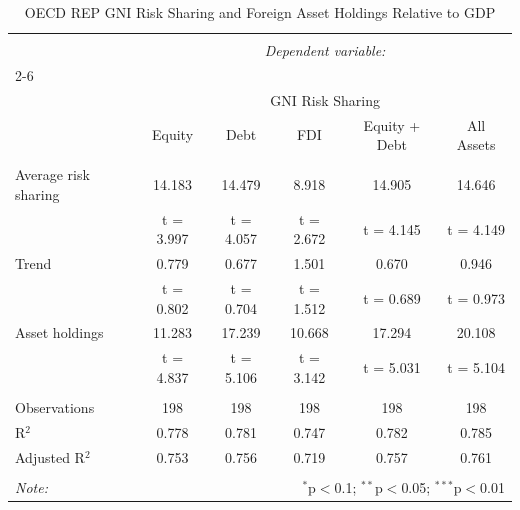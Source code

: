 
\begin{table}[!htbp] \centering 
  \caption{OECD REP GNI Risk Sharing and Foreign Asset Holdings Relative to GDP} 
  \label{} 
\begin{tabular}{@{\extracolsep{5pt}}lccccc} 
\\[-1.8ex]\hline 
\hline \\[-1.8ex] 
 & \multicolumn{5}{c}{\textit{Dependent variable:}} \\ 
\cline{2-6} 
\\[-1.8ex] & \multicolumn{5}{c}{GNI Risk Sharing} \\ 
 & Equity & Debt & FDI & Equity + Debt & All Assets \\ 
\hline \\[-1.8ex] 
 Average risk sharing & 14.183 & 14.479 & 8.918 & 14.905 & 14.646 \\ 
  & t = 3.997 & t = 4.057 & t = 2.672 & t = 4.145 & t = 4.149 \\ 
  Trend & 0.779 & 0.677 & 1.501 & 0.670 & 0.946 \\ 
  & t = 0.802 & t = 0.704 & t = 1.512 & t = 0.689 & t = 0.973 \\ 
  Asset holdings & 11.283 & 17.239 & 10.668 & 17.294 & 20.108 \\ 
  & t = 4.837 & t = 5.106 & t = 3.142 & t = 5.031 & t = 5.104 \\ 
 \hline \\[-1.8ex] 
Observations & 198 & 198 & 198 & 198 & 198 \\ 
R$^{2}$ & 0.778 & 0.781 & 0.747 & 0.782 & 0.785 \\ 
Adjusted R$^{2}$ & 0.753 & 0.756 & 0.719 & 0.757 & 0.761 \\ 
\hline 
\hline \\[-1.8ex] 
\textit{Note:}  & \multicolumn{5}{r}{$^{*}$p$<$0.1; $^{**}$p$<$0.05; $^{***}$p$<$0.01} \\ 
\end{tabular} 
\end{table} 

